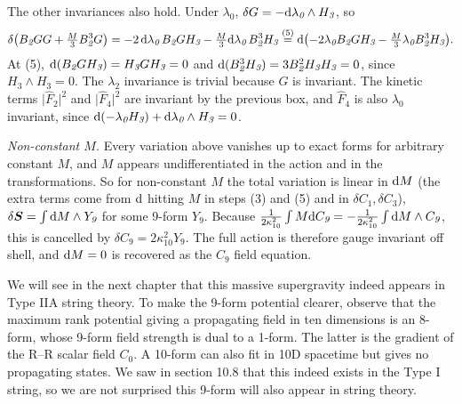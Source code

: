 \begin{tcolorbox}[breakable]
\begin{remark}
		The other invariances also hold. Under $\lambda_{\textit{0}}$, $\delta G=-\mathrm{d}\lambda_{\textit{0}}\wedge H_{\textit{3}}$, so
		\begin{align*}
			\delta\bigl(B_{\textit{2}}GG+\tfrac{M}{3}B_{\textit{2}}^{3}G\bigr)
			=-2\,\mathrm{d}\lambda_{\textit{0}}\,B_{\textit{2}}GH_{\textit{3}}-\tfrac{M}{3}\mathrm{d}\lambda_{\textit{0}}\,B_{\textit{2}}^{3}H_{\textit{3}}
			\overset{(5)}{=} \mathrm{d}\bigl(-2\lambda_{\textit{0}}B_{\textit{2}}GH_{\textit{3}}-\tfrac{M}{3}\lambda_{\textit{0}}B_{\textit{2}}^{3}H_{\textit{3}}\bigr) .
		\end{align*}
		At (5), $\mathrm{d}(B_{\textit{2}}GH_{\textit{3}})=H_{\textit{3}}GH_{\textit{3}}=0$ and $\mathrm{d}(B^{3}_{\textit{2}}H_{\textit{3}})=3B^{2}_{\textit{2}}H_{\textit{3}}H_{\textit{3}}=0$, since $H_{\textit{3}}\wedge H_{\textit{3}}=0$. The $\lambda_{\textit{2}}$ invariance is trivial because $G$ is invariant. The kinetic terms $\lvert\hat F_{\textit{2}}\rvert^{2}$ and $\lvert\hat F_{\textit{4}}\rvert^{2}$ are invariant by the previous box, and $\hat F_{\textit{4}}$ is also $\lambda_{\textit{0}}$ invariant, since $\mathrm{d}(-\lambda_{\textit{0}}H_{\textit{3}})+\mathrm{d}\lambda_{\textit{0}}\wedge H_{\textit{3}}=0$.

		\emph{Non-constant $M$.} Every variation above vanishes up to exact forms for arbitrary constant $M$, and $M$ appears undifferentiated in the action and in the transformations. So for non-constant $M$ the total variation is linear in $\mathrm{d} M$ (the extra terms come from $\mathrm{d}$ hitting $M$ in steps (3) and (5) and in $\delta C_{\textit{1}},\delta C_{\textit{3}}$), $\delta\bm S=\int\mathrm{d} M\wedge Y_{\textit{9}}$ for some 9-form $Y_{\textit{9}}$. Because $\frac{1}{2\kappa_{10}^{2}}\int M\mathrm{d} C_{\textit{9}}=-\frac{1}{2\kappa_{10}^{2}}\int\mathrm{d} M\wedge C_{\textit{9}}$, this is cancelled by $\delta C_{\textit{9}}=2\kappa_{10}^{2}Y_{\textit{9}}$. The full action is therefore gauge invariant off shell, and $\mathrm{d} M=0$ is recovered as the $C_{\textit{9}}$ field equation.
	\end{remark}
\end{tcolorbox}

We will see in the next chapter that this massive supergravity indeed appears in Type IIA string theory. To make the 9-form potential clearer, observe that the maximum rank potential giving a propagating field in ten dimensions is an 8-form, whose 9-form field strength is dual to a 1-form. The latter is the gradient of the R--R scalar field $C_{\textit{0}}$. A 10-form can also fit in 10D spacetime but gives no propagating states. We saw in section 10.8 that this indeed exists in the Type I string, so we are not surprised this 9-form will also appear in string theory.

